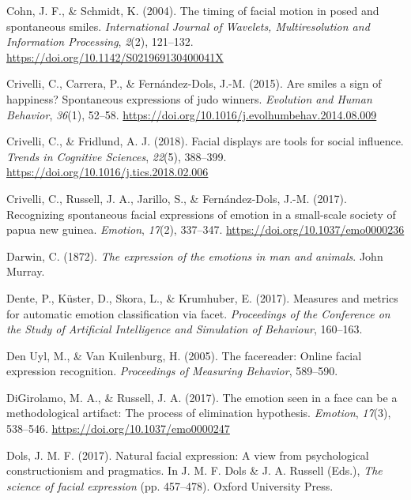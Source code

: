 \documentclass[
  english,
  doc]{apa7}
\newlength{\cslhangindent}
\newenvironment{cslreferences}%
  {\setlength{\parindent}{0pt}%
  \everypar{\setlength{\hangindent}{\cslhangindent}}\ignorespaces}%
  {\par}
\begin{document}
\begin{cslreferences}
\leavevmode\hypertarget{ref-cohn2003timing}{}%
Cohn, J. F., \& Schmidt, K. (2004). The timing of facial motion in posed and spontaneous smiles. \emph{International Journal of Wavelets, Multiresolution and Information Processing}, \emph{2}(2), 121--132. \url{https://doi.org/10.1142/S021969130400041X}

\leavevmode\hypertarget{ref-crivelli2015smiles}{}%
Crivelli, C., Carrera, P., \& Fernández-Dols, J.-M. (2015). Are smiles a sign of happiness? Spontaneous expressions of judo winners. \emph{Evolution and Human Behavior}, \emph{36}(1), 52--58. \url{https://doi.org/10.1016/j.evolhumbehav.2014.08.009}

\leavevmode\hypertarget{ref-crivelli2018facial}{}%
Crivelli, C., \& Fridlund, A. J. (2018). Facial displays are tools for social influence. \emph{Trends in Cognitive Sciences}, \emph{22}(5), 388--399. \url{https://doi.org/10.1016/j.tics.2018.02.006}

\leavevmode\hypertarget{ref-crivelli2017recognizing}{}%
Crivelli, C., Russell, J. A., Jarillo, S., \& Fernández-Dols, J.-M. (2017). Recognizing spontaneous facial expressions of emotion in a small-scale society of papua new guinea. \emph{Emotion}, \emph{17}(2), 337--347. \url{https://doi.org/10.1037/emo0000236}

\leavevmode\hypertarget{ref-darwin1872expression}{}%
Darwin, C. (1872). \emph{The expression of the emotions in man and animals}. John Murray.

\leavevmode\hypertarget{ref-dente2017measures}{}%
Dente, P., Küster, D., Skora, L., \& Krumhuber, E. (2017). Measures and metrics for automatic emotion classification via facet. \emph{Proceedings of the Conference on the Study of Artificial Intelligence and Simulation of Behaviour}, 160--163.

\leavevmode\hypertarget{ref-den2005facereader}{}%
Den Uyl, M., \& Van Kuilenburg, H. (2005). The facereader: Online facial expression recognition. \emph{Proceedings of Measuring Behavior}, 589--590.

\leavevmode\hypertarget{ref-digirolamo2017emotion}{}%
DiGirolamo, M. A., \& Russell, J. A. (2017). The emotion seen in a face can be a methodological artifact: The process of elimination hypothesis. \emph{Emotion}, \emph{17}(3), 538--546. \url{https://doi.org/10.1037/emo0000247}

\leavevmode\hypertarget{ref-dols2017natural}{}%
Dols, J. M. F. (2017). Natural facial expression: A view from psychological constructionism and pragmatics. In J. M. F. Dols \& J. A. Russell (Eds.), \emph{The science of facial expression} (pp. 457--478). Oxford University Press.


\end{cslreferences}
\end{document}

